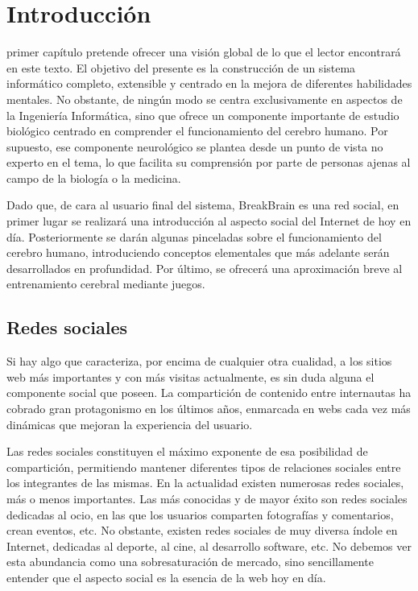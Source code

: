 \chapter{Introducción}
\label{chap:introduccion}

 primer capítulo pretende ofrecer una visión global de lo que el lector encontrará en este texto. El objetivo del presente es la construcción de un sistema informático completo, extensible y centrado en la mejora de diferentes habilidades mentales. No obstante, de ningún modo se centra exclusivamente en aspectos de la Ingeniería Informática, sino que ofrece un componente importante de estudio biológico centrado en comprender el funcionamiento del cerebro humano. Por supuesto, ese componente neurológico se plantea desde un punto de vista no experto en el tema, lo que facilita su comprensión por parte de personas ajenas al campo de la biología o la medicina.

Dado que, de cara al usuario final del sistema, BreakBrain es una red social, en primer lugar se realizará una introducción al aspecto social del Internet de hoy en día. Posteriormente se darán algunas pinceladas sobre el funcionamiento del cerebro humano, introduciendo conceptos elementales que más adelante serán desarrollados en profundidad. Por último, se ofrecerá una aproximación breve al entrenamiento cerebral mediante juegos.


\section{Redes sociales}

Si hay algo que caracteriza, por encima de cualquier otra cualidad, a los sitios web más importantes y con más visitas actualmente, es sin duda alguna el componente social que poseen. La compartición de contenido entre internautas ha cobrado gran protagonismo en los últimos años, enmarcada en webs cada vez más dinámicas que mejoran la experiencia del usuario. 

Las redes sociales constituyen el máximo exponente de esa posibilidad de compartición, permitiendo mantener diferentes tipos de relaciones sociales entre los integrantes de las mismas. En la actualidad existen numerosas redes sociales, más o menos importantes. Las más conocidas y de mayor éxito son redes sociales dedicadas al ocio, en las que los usuarios comparten fotografías y comentarios, crean eventos, etc. No obstante, existen redes sociales de muy diversa índole en Internet, dedicadas al deporte, al cine, al desarrollo software, etc. No debemos ver esta abundancia como una sobresaturación de mercado, sino sencillamente entender que el aspecto social es la esencia de la web hoy en día.

